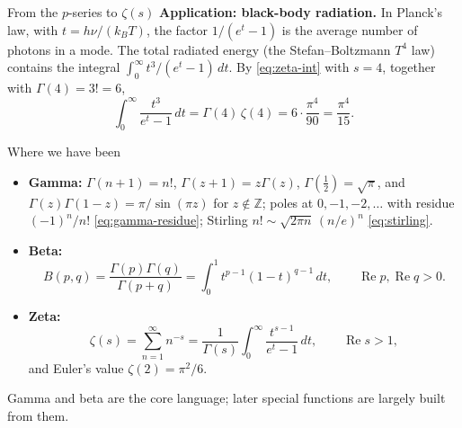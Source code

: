 \documentclass[11pt]{beamer}
\begin{document}
\begin{frame}[allowframebreaks=1.00]{From the \(p\)-series to \(\zeta(s)\)}
\textbf{Application: black-body radiation.} In Planck's law, with \(t=h\nu/(k_BT)\), the factor
\(1/(e^t-1)\) is the average number of photons in a mode. The total radiated energy (the
Stefan--Boltzmann \(T^4\) law) contains the integral \(\int_0^\infty t^3/(e^t-1)\,dt\). By
\eqref{eq:zeta-int} with \(s=4\), together with \(\Gamma(4)=3!=6\),
\[
  \int_0^\infty\frac{t^3}{e^t-1}\,dt=\Gamma(4)\,\zeta(4)=6\cdot\frac{\pi^4}{90}=\frac{\pi^4}{15}.
\]
\end{frame}




\begin{frame}{Where we have been}
\footnotesize
\begin{itemize}
  \item \textbf{Gamma:}
        \(\Gamma(n+1)=n!\),
        \(\Gamma(z+1)=z\Gamma(z)\),
        \(\Gamma(\tfrac12)=\sqrt\pi\), and
        \(\Gamma(z)\Gamma(1-z)=\pi/\sin(\pi z)\) for
        \(z\notin\mathbb Z\); poles at \(0,-1,-2,\dots\) with residue
        \((-1)^n/n!\) \eqref{eq:gamma-residue}; Stirling
        \(n!\sim\sqrt{2\pi n}\,(n/e)^n\) \eqref{eq:stirling}.
  \item \textbf{Beta:}
        \[
          B(p,q)
           =\frac{\Gamma(p)\Gamma(q)}{\Gamma(p+q)}
           =\int_0^1t^{p-1}(1-t)^{q-1}\,dt,
          \qquad \operatorname{Re}p,\operatorname{Re}q>0.
        \]
  \item \textbf{Zeta:}
        \[
          \zeta(s)=\sum_{n=1}^{\infty}n^{-s}
           =\frac1{\Gamma(s)}\int_0^\infty\frac{t^{s-1}}{e^t-1}\,dt,
          \qquad \operatorname{Re}s>1,
        \]
        and Euler's value \(\zeta(2)=\pi^2/6\).
\end{itemize}
Gamma and beta are the core language; later special functions are largely built from them.
\end{frame}
\end{document}
